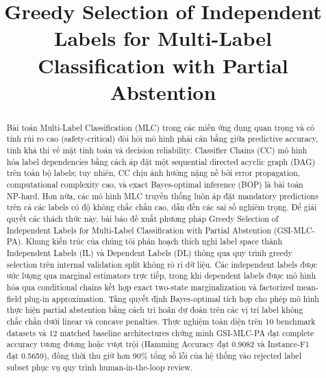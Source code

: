 \documentclass[conference]{IEEEtran}
\begin{document}
\title{Greedy Selection of Independent Labels for Multi-Label Classification with Partial Abstention}

\author{
}

\maketitle

\begin{abstract}
Bài toán Multi-Label Classification (MLC) trong các miền ứng dụng quan trọng và có tính rủi ro cao (safety-critical) đòi hỏi mô hình phải cân bằng giữa predictive accuracy, tính khả thi về mặt tính toán và decision reliability. Classifier Chains (CC) mô hình hóa label dependencies bằng cách áp đặt một sequential directed acyclic graph (DAG) trên toàn bộ labels; tuy nhiên, CC chịu ảnh hưởng nặng nề bởi error propagation, computational complexity cao, và exact Bayes-optimal inference (BOP) là bài toán NP-hard. Hơn nữa, các mô hình MLC truyền thống luôn áp đặt mandatory predictions trên cả các labels có độ không chắc chắn cao, dẫn đến các sai số nghiêm trọng. Để giải quyết các thách thức này, bài báo đề xuất phương pháp Greedy Selection of Independent Labels for Multi-Label Classification with Partial Abstention (GSI-MLC-PA). Khung kiến trúc của chúng tôi phân hoạch thích nghi label space thành Independent Labels (IL) và Dependent Labels (DL) thông qua quy trình greedy selection trên internal validation split không rò rỉ dữ liệu. Các independent labels được ước lượng qua marginal estimators trực tiếp, trong khi dependent labels được mô hình hóa qua conditional chains kết hợp exact two-state marginalization và factorized mean-field plug-in approximation. Tầng quyết định Bayes-optimal tích hợp cho phép mô hình thực hiện partial abstention bằng cách trì hoãn dự đoán trên các vị trí label không chắc chắn dưới linear và concave penalties. Thực nghiệm toàn diện trên 10 benchmark datasets và 12 matched baseline architectures chứng minh GSI-MLC-PA đạt complete accuracy tương đương hoặc vượt trội (Hamming Accuracy đạt 0.9082 và Instance-F1 đạt 0.5659), đồng thời thu giữ hơn 90\% tổng số lỗi của hệ thống vào rejected label subset phục vụ quy trình human-in-the-loop review.
\end{abstract}
\end{document}
